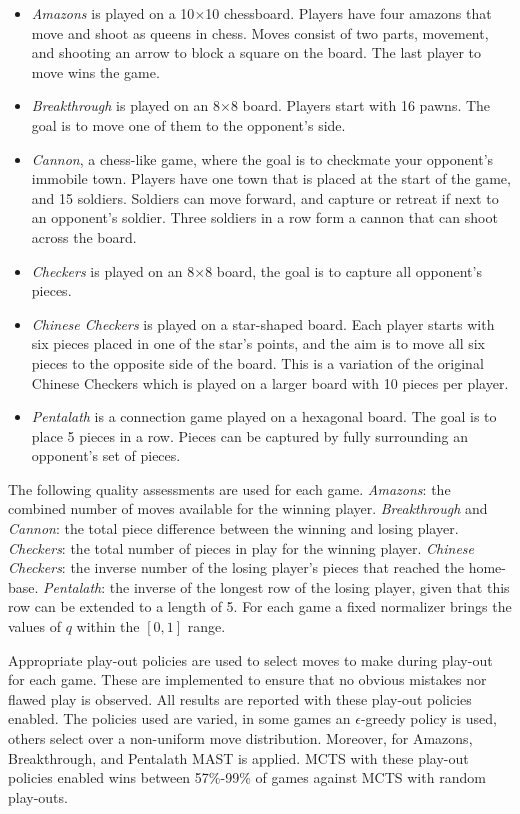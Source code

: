 \documentclass{ecai2014}
\begin{document}
\begin{itemize}
\item \emph{Amazons} is played on a 10$\times$10 chessboard. Players have four amazons that move and shoot as queens in chess. Moves consist of two parts, movement, and shooting an arrow to block a square on the board. The last player to move wins the game.
\item \emph{Breakthrough} is played on an 8$\times$8 board. Players start with 16 pawns. The goal is to move one of them to the opponent's side.
\item \emph{Cannon}, a chess-like game, where the goal is to checkmate your opponent's immobile town. Players have one town that is placed at the start of the game, and 15 soldiers. Soldiers can move  forward, and capture or retreat if next to an opponent's soldier. Three soldiers in a row form a cannon that can shoot across the board.
\item \emph{Checkers} is played on an 8$\times$8 board, the goal is to capture all opponent's pieces.
\item \emph{Chinese Checkers} is played on a star-shaped board. Each player starts with six pieces placed in one of the star's points, and the aim is to move all six pieces to the opposite side of the board. This is a variation of the original Chinese Checkers which is played on a larger board with 10 pieces per player.
\item \emph{Pentalath} is a connection game played on a hexagonal board. The goal is to place 5 pieces in a row. Pieces can be captured by fully surrounding an opponent's set of pieces.
\end{itemize}

The following quality assessments are used for each game. \emph{Amazons}: the combined number of moves available for the winning player. \emph{Breakthrough} and \emph{Cannon}: the total piece difference between the winning and losing player. \emph{Checkers}: the total number of pieces in play for the winning player. \emph{Chinese Checkers}: the inverse number of the losing player's pieces that reached the home-base. \emph{Pentalath}: the inverse of the longest row of the losing player, given that this row can be extended to a length of 5. For each game a fixed normalizer brings the values of $q$ within the $[0,1]$ range. 

Appropriate play-out policies are used to select moves to make during play-out for each game. These are implemented to ensure that no obvious mistakes nor flawed play is observed. All results are reported with these play-out policies enabled. The policies used are varied, in some games an $\epsilon$-greedy policy is used, others select over a non-uniform move distribution. Moreover, for Amazons, Breakthrough, and Pentalath MAST \cite{finnsson2008simulation} is applied. MCTS with these play-out policies enabled wins between 57\%-99\% of games against MCTS with random play-outs. 
\end{document}
